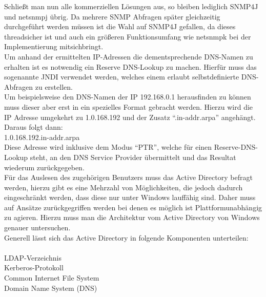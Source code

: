 Schließt man nun alle kommerziellen Lösungen aus, so bleiben lediglich SNMP4J und netsnmpj übrig.
Da mehrere SNMP Abfragen später gleichzeitig durchgeführt werden müssen ist die Wahl auf SNMP4J gefallen, da dieses threadsicher ist und auch ein größeren Funktionsumfang wie netsnmpk bei der Implementierung mitsichbringt.\\
Um anhand der ermittelten IP-Adressen die dementsprechende DNS-Namen zu erhalten ist es notwendig ein Reserve DNS-Lookup zu machen. Hierfür muss das sogenannte JNDI verwendet werden, welches einem erlaubt selbstdefinierte DNS-Abfragen zu erstellen.\\
Um beispielsweise den DNS-Namen der IP 192.168.0.1 herausfinden zu können muss dieser aber erst in ein spezielles Format gebracht werden. Hierzu wird die IP Adresse umgekehrt zu 1.0.168.192 und der Zusatz “.in-addr.arpa” angehängt. Daraus folgt dann:\\

1.0.168.192.in-addr.arpa\\

Diese Adresse wird inklusive dem Modus “PTR”, welche für einen Reserve-DNS-Lookup steht, an den DNS Service Provider übermittelt und das Resultat wiederum zurückgegeben.\\

Für das Auslesen des zugehörigen Benutzers muss das Active Directory befragt werden, hierzu gibt es eine Mehrzahl von Möglichkeiten, die jedoch dadurch eingeschränkt werden, dass diese nur unter Windows lauffähig sind. Daher muss auf Ansätze zurückgegriffen werden bei denen es möglich ist Plattformunabhängig zu agieren. Hierzu muss man die Architektur vom Active Directory von Windows genauer untersuchen.\\
Generell lässt sich das Active Directory in folgende Komponenten unterteilen:\\
\\
LDAP-Verzeichnis\\
Kerberos-Protokoll\\
Common Internet File System\\
Domain Name System (DNS)\\


